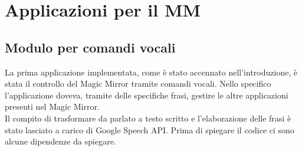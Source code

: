 \chapter{Applicazioni per il MM}

\section{Modulo per comandi vocali}
La prima applicazione implementata, come è stato accennato nell'introduzione, è
stata il controllo del Magic Mirror tramite comandi vocali.
Nello specifico l'applicazione doveva, tramite delle specifiche frasi,
gestire le altre applicazioni presenti nel Magic Mirror.\\
Il compito di trasformare da parlato a testo scritto e l'elaborazione delle frasi è stato
lasciato a carico di Google Speech API.
Prima di spiegare il codice ci sono alcune dipendenze da spiegare.

